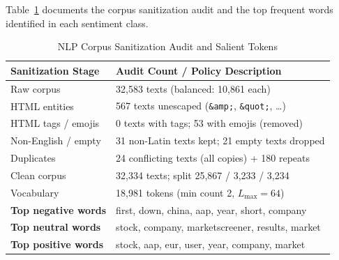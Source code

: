 \documentclass[10pt,journal]{IEEEtran}
\begin{document}
Table~\ref{tab:nlp_prep} documents the corpus sanitization audit and the top frequent words identified in each sentiment class.

\begin{table}[htbp]
\centering
\caption{NLP Corpus Sanitization Audit and Salient Tokens}
\label{tab:nlp_prep}
\begin{tabular}{ll}
\toprule
\textbf{Sanitization Stage} & \textbf{Audit Count / Policy Description} \\
\midrule
Raw corpus               & 32,583 texts (balanced: 10,861 each) \\
HTML entities            & 567 texts unescaped (\texttt{\&amp;}, \texttt{\&quot;}, \ldots) \\
HTML tags / emojis       & 0 texts with tags; 53 with emojis (removed) \\
Non-English / empty      & 31 non-Latin texts kept; 21 empty texts dropped \\
Duplicates               & 24 conflicting texts (all copies) + 180 repeats \\
Clean corpus             & 32,334 texts; split 25,867 / 3,233 / 3,234 \\
Vocabulary               & 18,981 tokens (min count 2, $L_{\text{max}} = 64$) \\
\midrule
\textbf{Top negative words} & first, down, china, aap, year, short, company \\
\textbf{Top neutral words}  & stock, company, marketscreener, results, market \\
\textbf{Top positive words} & stock, aap, eur, user, year, company, market \\
\bottomrule
\end{tabular}
\end{table}
\end{document}

